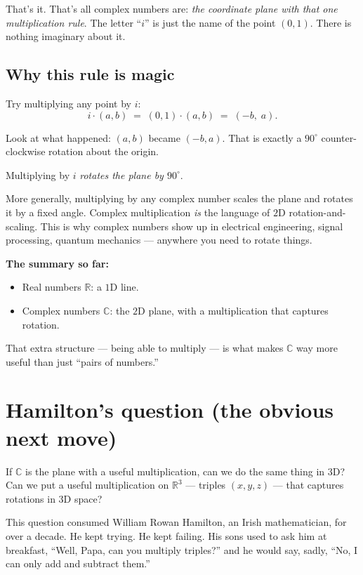 \documentclass[11pt]{article}
\newcommand{\R}{\mathbb{R}}
\newcommand{\C}{\mathbb{C}}
\begin{document}
That's it. That's all complex numbers are: \emph{the coordinate plane
with that one multiplication rule}. The letter ``$i$'' is just the
name of the point $(0, 1)$. There is nothing imaginary about it.

\subsection*{Why this rule is magic}

Try multiplying any point by $i$:
\[
i \cdot (a, b) \;=\; (0, 1) \cdot (a, b) \;=\; (-b, \; a) .
\]

Look at what happened: $(a, b)$ became $(-b, a)$. That is exactly a
$90^{\circ}$ counter-clockwise rotation about the origin.

Multiplying by $i$ \emph{rotates the plane by $90^{\circ}$}.

More generally, multiplying by any complex number scales the plane
and rotates it by a fixed angle. Complex multiplication \emph{is}
the language of $2$D rotation-and-scaling. This is why complex
numbers show up in electrical engineering, signal processing,
quantum mechanics --- anywhere you need to rotate things.

\textbf{The summary so far:}
\begin{itemize}[leftmargin=*, itemsep=2pt]
  \item Real numbers $\R$: a $1$D line.
  \item Complex numbers $\C$: the $2$D plane, with a multiplication
        that captures rotation.
\end{itemize}

That extra structure --- being able to multiply --- is what makes
$\C$ way more useful than just ``pairs of numbers.''

\section*{Hamilton's question (the obvious next move)}

If $\C$ is the plane with a useful multiplication, can we do the same
thing in $3$D? Can we put a useful multiplication on
$\R^3$ --- triples $(x, y, z)$ --- that captures rotations in
$3$D space?

This question consumed William Rowan Hamilton, an Irish
mathematician, for over a decade. He kept trying. He kept failing.
His sons used to ask him at breakfast, ``Well, Papa, can you
multiply triples?'' and he would say, sadly, ``No, I can only add and
subtract them.''
\end{document}
